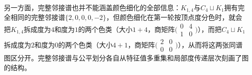 另一方面，完整邻接谱也并不能涵盖颜色细化的全部信息：$K_{1,4}$与$C_4\sqcup K_1$拥有完全相同的完整邻接谱$\{2,0,0,0,-2\}$，但颜色细化在第一轮按顶点度分色时，就会把$K_{1,4}$拆成度为$4$和度为$1$的两个色类（大小$1+4$，商矩阵$\bigl(\begin{smallmatrix}0&4\\1&0\end{smallmatrix}\bigr)$），而把$C_4\sqcup K_1$拆成度为$2$和度为$0$的两个色类（大小$4+1$，商矩阵$\bigl(\begin{smallmatrix}2&0\\0&0\end{smallmatrix}\bigr)$），从而将这两张同谱图区分开。完整邻接谱与公平划分各自从特征值多重集和局部度传递层次刻画了图的结构。
